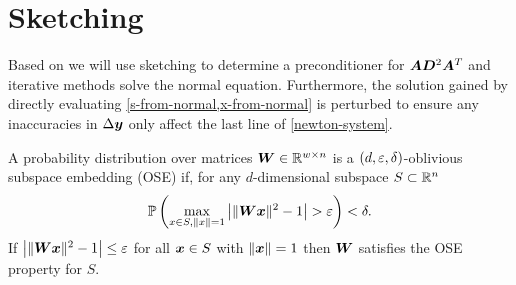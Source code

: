 \chapter{Sketching}

Based on \cite{Avron-FasterRandomizedInfeasibleIPMs} we will use sketching to determine a preconditioner for \(\bm{A} \bm{D}^2 \bm{A}^T\) and iterative methods solve the normal equation. Furthermore, the solution gained by directly evaluating \cref{s-from-normal,x-from-normal} is perturbed to ensure any inaccuracies in \(\Delta\bm{y}\) only affect the last line of \cref{newton-system}.


\begin{definition} \label{def:oblivious-subspace-embedding}
A probability distribution over matrices \(\bm{W} \in \mathbb{R}^{w \times n}\) is a \((d, \varepsilon, \delta)\)-oblivious subspace embedding (OSE) if, for any \(d\)-dimensional subspace \(S \subset \mathbb{R}^n\) 
\[ \mathbb{P} \left(  \max_{x \in S, \lVert x \rVert = 1} \left\lvert  \lVert \bm{W}\bm{x} \rVert^2 - 1 \right\rvert > \varepsilon  \right) < \delta. \]
If \(\left\lvert  \lVert \bm{W}\bm{x} \rVert^2 - 1 \right\rvert \leq \varepsilon\) for all \(\bm{x} \in S\) with \(\lVert \bm{x} \rVert = 1\) then \(\bm{W}\) satisfies the OSE property for \(S\).
\end{definition}

